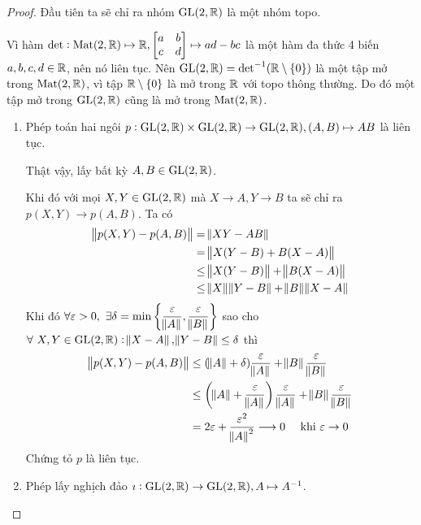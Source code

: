 \begin{proof}
    Đầu tiên ta sẽ chỉ ra nhóm $\operatorname{GL}(2,\mathbb{R})$ là một nhóm topo. 
    
    Vì hàm $\det:\operatorname{Mat}(2,\mathbb{R}) \mapsto \mathbb{R}, \begin{bmatrix} a & b \\ c & d \\ \end{bmatrix} \mapsto ad-bc$ là một hàm đa thức 4 biến $a,b,c,d \in \mathbb{R}$, nên nó liên tục. Nên $\operatorname{GL}(2,\mathbb{R}) = \det^{-1}(\mathbb{R} \setminus\{0\})$ là một tập mở trong $\operatorname{Mat}(2,\mathbb{R})$, vì tập $\mathbb{R}\setminus\{0\}$ là mở trong $\mathbb{R}$ với topo thông thường. Do đó một tập mở trong $\operatorname{GL}(2,\mathbb{R})$ cũng là mở trong $\operatorname{Mat}(2,\mathbb{R})$.
    \begin{enumerate}
        \item Phép toán hai ngôi $p: \operatorname{GL}(2,\mathbb{R}) \times \operatorname{GL}(2,\mathbb{R}) \to \operatorname{GL}(2,\mathbb{R}), (A,B)\mapsto AB$ là liên tục.

        Thật vậy, lấy bất kỳ $A, B \in \operatorname{GL}(2,\mathbb{R})$. 
        
        Khi đó với mọi $X,Y  \in \operatorname{GL}(2,\mathbb{R})$ mà $X \to A, Y \to B$ ta sẽ chỉ ra $p(X,Y) \to p(A,B)$. Ta có
        \begin{align*}
            \norm{p(X,Y)-p(A,B)} &= \norm{XY - AB} \\
            &= \norm{X(Y-B) + B(X-A)} \\
            &\leq \norm{X(Y-B)} + \norm{B(X-A)} \\
            &\leq \norm{X}\norm{Y-B} + \norm{B}\norm{X-A}
         \end{align*}
         Khi đó $\forall \varepsilon >0,~\exists\delta = \min\left\{\dfrac{\varepsilon}{\norm{A}}, \dfrac{\varepsilon}{\norm{B}}\right\}$ sao cho $\forall~X,Y \in \operatorname{GL}(2,\mathbb{R}): \norm{X-A},\norm{Y-B} \leq \delta$ thì 
         \begin{align*}
             \norm{p(X,Y)-p(A,B)} &\leq (\norm{A}+\delta)\dfrac{\varepsilon}{\norm{A}} + \norm{B}\dfrac{\varepsilon}{\norm{B}} \\
             &\leq \left(\norm{A}+\dfrac{\varepsilon}{\norm{A}}\right)\dfrac{\varepsilon}{\norm{A}} + \norm{B}\dfrac{\varepsilon}{\norm{B}} \\
             &= 2\varepsilon + \dfrac{\varepsilon^2}{\norm{A}^2} \longrightarrow 0 \quad \text{ khi } \varepsilon \to 0
         \end{align*}
         Chứng tỏ $p$ là liên tục.

         \item Phép lấy nghịch đảo $\imath : \operatorname{GL}(2,\mathbb{R}) \to \operatorname{GL}(2,\mathbb{R}),A \mapsto A^{-1}$.

         

\end{enumerate}
\end{proof}
